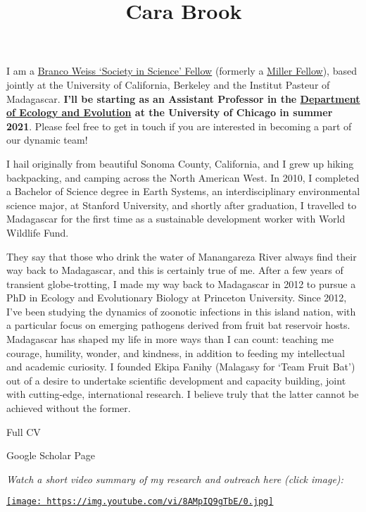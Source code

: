 \documentclass[
]{article}
\title{\textbf{Cara Brook}}
\author{}
\date{\vspace{-2.5em}}
\begin{document}
\maketitle

I am a \href{https://brancoweissfellowship.org/}{Branco Weiss `Society
in Science' Fellow} (formerly a
\href{http://miller.berkeley.edu/}{Miller Fellow}), based jointly at the
University of California, Berkeley and the Institut Pasteur of
Madagascar. \textbf{I'll be starting as an Assistant Professor in the
\href{https://ecologyandevolution.uchicago.edu/}{Department of Ecology
and Evolution} at the University of Chicago in summer 2021}. Please feel
free to get in touch if you are interested in becoming a part of our
dynamic team!

I hail originally from beautiful Sonoma County, California, and I grew
up hiking backpacking, and camping across the North American West. In
2010, I completed a Bachelor of Science degree in Earth Systems, an
interdisciplinary environmental science major, at Stanford University,
and shortly after graduation, I travelled to Madagascar for the first
time as a sustainable development worker with World Wildlife Fund.

They say that those who drink the water of Manangareza River always find
their way back to Madagascar, and this is certainly true of me. After a
few years of transient globe-trotting, I made my way back to Madagascar
in 2012 to pursue a PhD in Ecology and Evolutionary Biology at Princeton
University. Since 2012, I've been studying the dynamics of zoonotic
infections in this island nation, with a particular focus on emerging
pathogens derived from fruit bat reservoir hosts. Madagascar has shaped
my life in more ways than I can count: teaching me courage, humility,
wonder, and kindness, in addition to feeding my intellectual and
academic curiosity. I founded Ekipa Fanihy (Malagasy for `Team Fruit
Bat') out of a desire to undertake scientific development and capacity
building, joint with cutting-edge, international research. I believe
truly that the latter cannot be achieved without the former.

Full CV

Google Scholar Page

\emph{Watch a short video summary of my research and outreach here
(click image):}

\href{https://www.youtube.com/embed/8AMpIQ9gTbE}{\texttt{[image: https://img.youtube.com/vi/8AMpIQ9gTbE/0.jpg]}}
\end{document}
